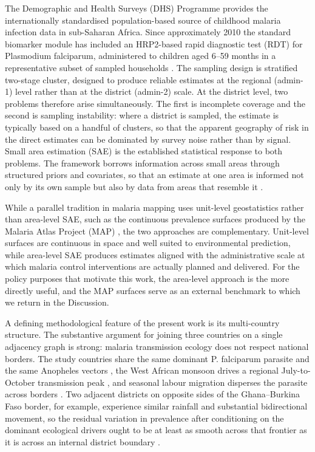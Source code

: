 \documentclass{article}
\begin{document}
The Demographic and Health Surveys (DHS) Programme provides the
internationally standardised population-based source of childhood
malaria infection data in sub-Saharan Africa. Since approximately 2010
the standard biomarker module has included an HRP2-based rapid
diagnostic test (RDT) for Plasmodium falciparum, administered to
children aged 6--59 months in a representative subset of sampled
households \citep{florey2014, croft2018}. The sampling design is
stratified two-stage cluster, designed to produce reliable estimates at
the regional (admin-1) level rather than at the district (admin-2)
scale. At the district level, two problems therefore arise
simultaneously. The first is incomplete coverage and the second is
sampling instability: where a district is sampled, the estimate is
typically based on a handful of clusters, so that the apparent geography
of risk in the direct estimates can be dominated by survey noise rather
than by signal. Small area estimation (SAE) is the established
statistical response to both problems. The framework borrows information
across small areas through structured priors and covariates, so that an
estimate at one area is informed not only by its own sample but also by
data from areas that resemble it \citep{rao2015}.

While a parallel tradition in malaria mapping uses unit-level
geostatistics rather than area-level SAE, such as the continuous
prevalence surfaces produced by the Malaria Atlas Project (MAP)
\citep{gething2011, bhatt2015, weiss2020}, the two approaches are
complementary. Unit-level surfaces are continuous in space and well
suited to environmental prediction, while area-level SAE produces
estimates aligned with the administrative scale at which malaria control
interventions are actually planned and delivered. For the policy
purposes that motivate this work, the area-level approach is the more
directly useful, and the MAP surfaces serve as an external benchmark to
which we return in the Discussion.

A defining methodological feature of the present work is its
multi-country structure. The substantive argument for joining three
countries on a single adjacency graph is strong: malaria transmission
ecology does not respect national borders. The study countries share the
same dominant P. falciparum parasite and the same Anopheles vectors
\citep{who2023}, the West African monsoon drives a regional
July-to-October transmission peak \citep{bhatt2015}, and seasonal labour
migration disperses the parasite across borders \citep{gething2011}. Two
adjacent districts on opposite sides of the Ghana--Burkina Faso border,
for example, experience similar rainfall and substantial bidirectional
movement, so the residual variation in prevalence after conditioning on
the dominant ecological drivers ought to be at least as smooth across
that frontier as it is across an internal district boundary
\citep{weiss2020}.
\end{document}

